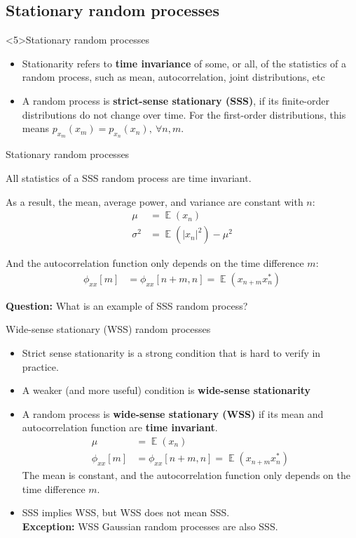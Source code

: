 \documentclass[10pt, handout]{beamer}
\DeclareMathOperator{\E}{\mathbb{E}} %
\begin{document}
\subsection{Stationary random processes}
\begin{frame}<5>{Stationary random processes}
\begin{itemize}
	\item Stationarity refers to \textbf{time invariance} of some, or all, of the statistics of a random process, such as mean, autocorrelation, joint distributions, etc
	\item A random process is \textbf{strict-sense stationary (SSS)}, if its finite-order distributions do not change over time. For the first-order distributions, this means $p_{x_m}(x_m) = p_{x_n}(x_n),~\forall n, m$.
\end{itemize}
 
\centering
\resizebox{0.7\linewidth}{!}{}
\end{frame}

\begin{frame}{Stationary random processes}

All statistics of a SSS random process are time invariant. 

As a result, the mean, average power, and variance are constant with $n$:
\begin{align*}
\mu &= \E(x_n) \\
\sigma^2 &= \E(|x_n|^2) - \mu^2
\end{align*}

And the autocorrelation function only depends on the time difference $m$:
\begin{align*}
\phi_{xx}[m] &= \phi_{xx}[n+m, n] = \E(x_{n+m}x_n^*)
\end{align*}

\textbf{Question:} What is an example of SSS random process?

\end{frame}

\begin{frame}{Wide-sense stationary (WSS) random processes}

\begin{itemize}
	\item Strict sense stationarity is a strong condition that is hard to verify in practice.
	\pause\item A weaker (and more useful) condition is \textbf{wide-sense stationarity}
	\pause\item A random process is \textbf{wide-sense stationary (WSS)} if its mean and autocorrelation function are \textbf{time invariant}. 
	\begin{align*}
	\mu &= \E(x_n) \\
	\phi_{xx}[m] &= \phi_{xx}[n+m, n] = \E(x_{n+m}x_n^*)
	\end{align*}
	The mean is constant, and the autocorrelation function only depends on the time difference $m$.
	\pause\item SSS implies WSS, but WSS does not mean SSS. \\
	\textbf{Exception:} WSS Gaussian random processes are also SSS.	
\end{itemize}
\end{frame}
\end{document}
